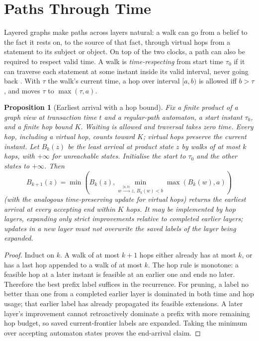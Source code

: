 \documentclass[11pt]{article}
\theoremstyle{plain}
\newtheorem{proposition}[theorem]{Proposition}
\theoremstyle{definition}
\theoremstyle{remark}
\begin{document}
\section{Paths Through Time}\label{sec:paths}

Layered graphs make paths across layers natural: a walk can go from a belief to
the fact it rests on, to the source of that fact, through virtual hops from a
statement to its subject or object. On top of the two clocks, a path can also be
required to respect valid time. A walk is \emph{time-respecting} from start time
$\tau_0$ if it can traverse each statement at some instant inside its valid
interval, never going back \cite{kempe2002connectivity,holme2012temporal}. With
$\tau$ the walk's current time, a hop over interval $[a,b)$ is allowed iff
$b>\tau$, and moves $\tau$ to $\max(\tau,a)$.

\begin{proposition}[Earliest arrival with a hop bound]
Fix a finite product of a graph view at transaction time $t$ and a regular-path
automaton, a start instant $\tau_0$, and a finite hop bound $K$. Waiting is
allowed and traversal takes zero time. Every hop, including a virtual hop,
counts toward $K$; virtual hops preserve the current instant.
Let $B_k(z)$ be the least arrival at product state $z$ by walks of at most $k$
hops, with $+\infty$ for unreachable states. Initialise the start to $\tau_0$
and the other states to $+\infty$. Then
\[
 B_{k+1}(z)=\min\left(B_k(z),\min_{w\xrightarrow{[a,b)}z,\,B_k(w)<b}
              \max(B_k(w),a)\right)
\]
(with the analogous time-preserving update for virtual hops) returns the earliest
arrival at every accepting end within $K$ hops. It may be implemented by hop
layers, expanding only strict improvements relative to completed earlier layers;
updates in a new layer must not overwrite the saved labels of the layer being expanded.
\end{proposition}

\begin{proof}
Induct on $k$. A walk of at most $k+1$ hops either already has at most $k$, or
has a last hop appended to a walk of at most $k$. The hop rule is monotone:
a feasible hop at a later instant is feasible at an earlier one and ends no
later. Therefore the best prefix label suffices in the recurrence. For pruning,
a label no better than one from a completed earlier layer is dominated in both
time and hop usage; that earlier label has already propagated its feasible
extensions. A later layer's improvement cannot retroactively dominate a prefix
with more remaining hop budget, so saved current-frontier labels are expanded.
Taking the minimum over accepting automaton states proves the end-arrival claim.
\end{proof}
\end{document}
